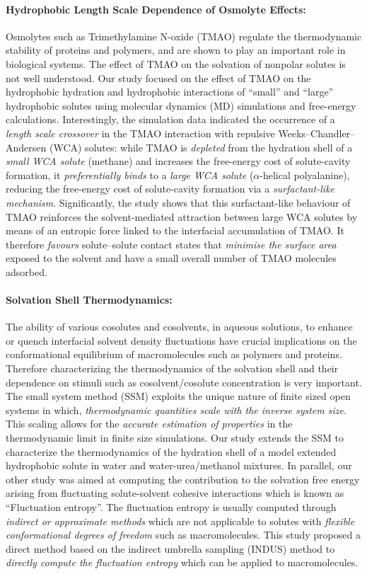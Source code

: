 \documentclass[a4paper,14pt]{article}
\begin{document}
\paragraph{\textbf{Hydrophobic Length Scale Dependence of Osmolyte Effects:}}
Osmolytes such as Trimethylamine N-oxide (TMAO) regulate the thermodynamic
stability of proteins and polymers, and are shown to play an important role in
biological systems. The effect of TMAO on the solvation of nonpolar solutes is
not well understood. Our study focused on the effect of TMAO on the
hydrophobic hydration and hydrophobic interactions of \enquote{small} and
\enquote{large} hydrophobic solutes using  molecular dynamics (MD) simulations
and free-energy calculations. Interestingly, the simulation data indicated the
occurrence of a \textit{length scale crossover} in the TMAO interaction with
repulsive Weeks–Chandler–Andersen (WCA) solutes: while TMAO is
\textit{depleted} from the hydration shell of a \textit{small WCA solute}
(methane) and increases the free-energy cost of solute-cavity formation, it
\textit{preferentially binds} to a \textit{large WCA solute} ($\alpha$-helical
polyalanine), reducing the free-energy cost of solute-cavity formation via a
\textit{surfactant-like mechanism}. Significantly, the study shows that this
surfactant-like behaviour of TMAO reinforces the solvent-mediated attraction
between large WCA solutes by means of an entropic force linked to the
interfacial accumulation of TMAO.   It therefore \textit{favours} solute–solute
contact states that \textit{minimise the surface area} exposed to the solvent
and have a small overall number of TMAO molecules adsorbed.

\paragraph{\textbf{Solvation Shell Thermodynamics:}}
The ability of various cosolutes and cosolvents, in aqueous solutions,  to
enhance or quench interfacial solvent density fluctuations have crucial
implications on the conformational equilibrium of macromolecules such as
polymers and proteins. Therefore characterizing the thermodynamics of the
solvation shell and their dependence on stimuli such as cosolvent/cosolute
concentration is very important. The small system method (SSM) exploits the
unique nature of finite sized open systems in which, \textit{thermodynamic
quantities scale with the inverse system size}.  This scaling allows for the
\textit{accurate estimation of properties} in the thermodynamic limit in finite
size simulations.  Our study extends the SSM to characterize the thermodynamics
of the hydration shell of a model extended hydrophobic solute in water and
water-urea/methanol mixtures. In parallel, our other study was aimed at
computing the contribution to the solvation free energy arising from
fluctuating solute-solvent cohesive interactions which is known as
\enquote{Fluctuation entropy}. The fluctuation entropy is usually computed
through \textit{indirect or approximate methods} which are not applicable to
solutes with \textit{flexible conformational degrees of freedom} such as
macromolecules. This study proposed a direct method based on the indirect
umbrella sampling (INDUS) method to \textit{directly compute the fluctuation
entropy} which can be applied to macromolecules.
\end{document}
